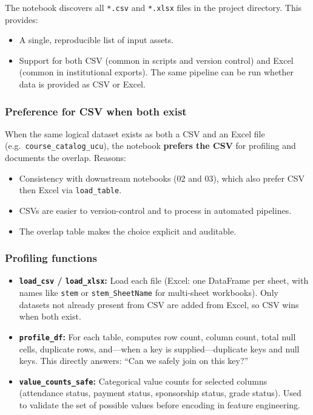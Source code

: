 \documentclass[12pt,a4paper]{article}
\begin{document}
The notebook discovers all \texttt{*.csv} and \texttt{*.xlsx} files in the project directory. This provides:

\begin{itemize}[leftmargin=*]
  \item A single, reproducible list of input assets.
  \item Support for both CSV (common in scripts and version control) and Excel (common in institutional exports). The same pipeline can be run whether data is provided as CSV or Excel.
\end{itemize}

\subsubsection{Preference for CSV when both exist}

When the same logical dataset exists as both a CSV and an Excel file (e.g.\ \texttt{course\_catalog\_ucu}), the notebook \textbf{prefers the CSV} for profiling and documents the overlap. Reasons:

\begin{itemize}[leftmargin=*]
  \item Consistency with downstream notebooks (02 and 03), which also prefer CSV then Excel via \texttt{load\_table}.
  \item CSVs are easier to version-control and to process in automated pipelines.
  \item The overlap table makes the choice explicit and auditable.
\end{itemize}

\subsubsection{Profiling functions}

\begin{itemize}[leftmargin=*]
  \item \textbf{\texttt{load\_csv} / \texttt{load\_xlsx}:} Load each file (Excel: one DataFrame per sheet, with names like \texttt{stem} or \texttt{stem\_SheetName} for multi-sheet workbooks). Only datasets not already present from CSV are added from Excel, so CSV wins when both exist.
  \item \textbf{\texttt{profile\_df}:} For each table, computes row count, column count, total null cells, duplicate rows, and---when a key is supplied---duplicate keys and null keys. This directly answers: ``Can we safely join on this key?''
  \item \textbf{\texttt{value\_counts\_safe}:} Categorical value counts for selected columns (attendance status, payment status, sponsorship status, grade status). Used to validate the set of possible values before encoding in feature engineering.
\end{itemize}
\end{document}
